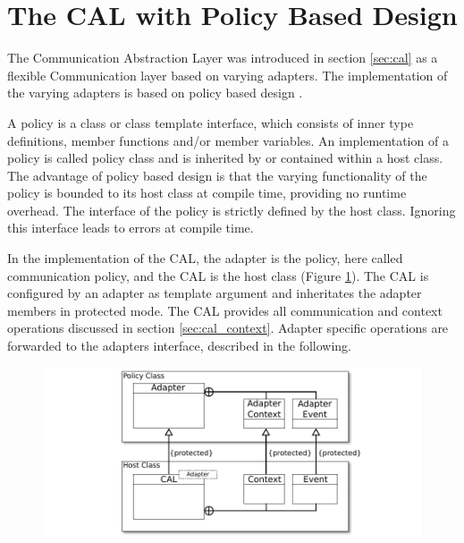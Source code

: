 \section{The CAL with Policy Based Design}

The Communication Abstraction Layer was introduced in section
\ref{sec:cal} as a flexible Communication layer based on varying
adapters. The implementation of the varying adapters is based on
policy based design \cite{ref:policy_based_design}.

A policy is a class or class template interface, which consists of
inner type definitions, member functions and/or member variables. An
implementation of a policy is called policy class and is inherited by
or contained within a host class.  The advantage of policy based
design is that the varying functionality of the policy is bounded to
its host class at compile time, providing no runtime overhead.  The
interface of the policy is strictly defined by the host
class. Ignoring this interface leads to errors at compile time.

In the implementation of the CAL, the adapter is the policy, here
called communication policy, and the CAL is the host class (Figure
\ref{fig:cal_uml}). The CAL is configured by an adapter as template
argument and inheritates the adapter members in protected mode. The
CAL provides all communication and context operations discussed in
section \ref{sec:cal_context}. Adapter specific operations are
forwarded to the adapters interface, described in the following.


\begin{figure}[H]
  \centering \includegraphics[width=\textwidth]{graphics/40_cal_uml}
  \caption{ }
  \label{fig:cal_uml}
\end{figure}

